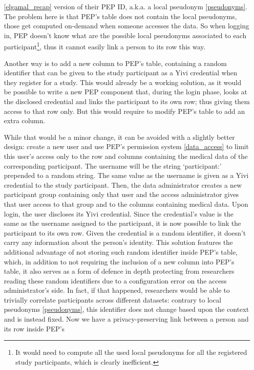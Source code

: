 \documentclass{report}
\begin{document}
\ref{elgamal_recap} version of their PEP ID, a.k.a. a local pseudonym \ref{pseudonyms}. The problem here is that PEP's table does not contain the local pseudonyms, those get
computed on-demand when someone accesses the data. So when logging in, PEP doesn't know what are the possible local pseudonyms associated to each participant\footnote{It
would need to compute all the used local pseudonyms for all the registered study participants, which is clearly inefficient.}, thus it cannot easily link a person to its row this way. \par
Another way is to add a new column to PEP's table, containing a random identifier that can be given to the study participant as a Yivi credential when they register for a study.
This would already be a working solution, as it would be possible to write a new PEP component that, during the login phase, looks at the disclosed credential and links the
participant to its own row; thus giving them access to that row only. But this would require to modify PEP's table to add an extra column. \par 
While that would be a minor change,
it can be avoided with a slightly better design: create a new user and use PEP's permission system \ref{data_access} to limit this user's access only to the row and columns containing
the medical data of the corresponding participant. The username will be the string \enquote*{participant:} prepended to a random string. The same value as the username is given as
a Yivi credential to the study participant. Then, the data administrator creates a new participant group containing only that user and the access administrator gives that user
access to that group and to the columns containing medical data. Upon login, the user discloses its Yivi credential. Since the credential's value is the same as the username
assigned to the participant, it is now possible to link the participant to its own row. Given the credential is a random identifier, it doesn't carry any information about the
person's identity. This solution features the additional advantage of not storing such random identifier inside PEP's table, which, in addition to not requiring the inclusion of a
new column into PEP's table, it also serves as a form of defence in depth protecting from researchers reading these random identifiers due to a configuration error on the access
administrator's side. In fact, if that happened, researchers would be able to trivially correlate participants across different datasets: contrary to local pseudonyms
\ref{pseudonyms}, this identifier does not change based upon the context and is instead fixed. Now we have a privacy-preserving link between a person and its row inside PEP's
\end{document}
